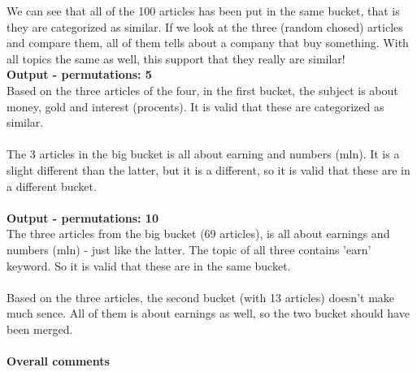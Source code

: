 \documentclass{article}
\begin{document}
We can see that all of the 100 articles has been put in the same bucket, that is they are categorized as similar. If we look at the three (random chosed) articles and compare them, all of them tells about a company that buy something. With all topics the same as well, this support that they really are similar!~\\
\textbf{Output - permutations: 5}\\
Based on the three articles of the four, in the first bucket, the subject is about money, gold and interest (procents). It is valid that these are categorized as similar. \\
~\\
The 3 articles in the big bucket is all about earning and numbers (mln). It is a slight different than the latter, but it is a different, so it is valid that these are in a different bucket. \\
~\\
\textbf{Output - permutations: 10}\\
The three articles from the big bucket (69 articles), is all about earnings and numbers (mln) - just like the latter. The topic of all three contains 'earn' keyword. So it is valid that these are in the same bucket. \\
~\\
Based on the three articles, the second bucket (with 13 articles) doesn't make much sence. All of them is about earnings as well, so the two bucket should have been merged. \\
~\\
\textbf{Overall comments}\\
\end{document}
